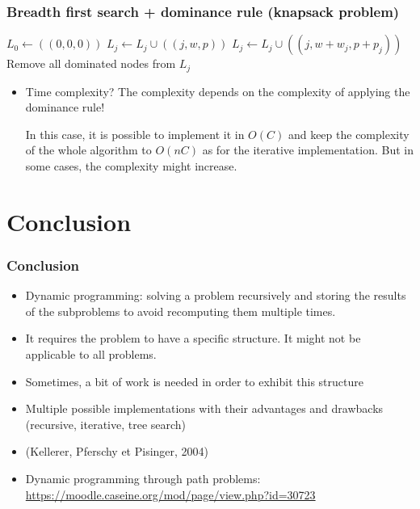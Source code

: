 \documentclass{beamer}
\begin{document}
\begin{frame}
  \frametitle{Breadth first search + dominance rule (knapsack problem)}

  \begin{algorithmic}
    \State $L_0 \gets ((0, 0, 0))$
    \State $L_j \gets L_j \cup ((j, w, p)) $
    \State $L_j \gets L_j \cup ((j, w + w_j, p + p_j))$
    \EndIf
    \EndFor
    \State \alert{Remove all dominated nodes from $L_j$}
    \EndFor
    \EndProcedure
  \end{algorithmic}

  \begin{itemize}
    \item \pause Time complexity? \pause The complexity depends on the complexity of applying the dominance rule!

  In this case, it is possible to implement it in $O(C)$ and keep the complexity of the whole algorithm to $O(nC)$ as for the iterative implementation. But in some cases, the complexity might increase.
  \end{itemize}
\end{frame}

\section{Conclusion}

\begin{frame}
  \frametitle{Conclusion}

  \begin{itemize}
    \item Dynamic programming: solving a problem recursively and storing the results of the subproblems to avoid recomputing them multiple times.
    \item It requires the problem to have a specific structure. It might not be applicable to all problems.
    \item Sometimes, a bit of work is needed in order to exhibit this structure
    \item Multiple possible implementations with their advantages and drawbacks (recursive, iterative, tree search)
    \item {} (Kellerer, Pferschy et Pisinger, 2004)
    \item Dynamic programming through path problems: \url{https://moodle.caseine.org/mod/page/view.php?id=30723}
  \end{itemize}

\end{frame}

\maketitle
\end{document}
